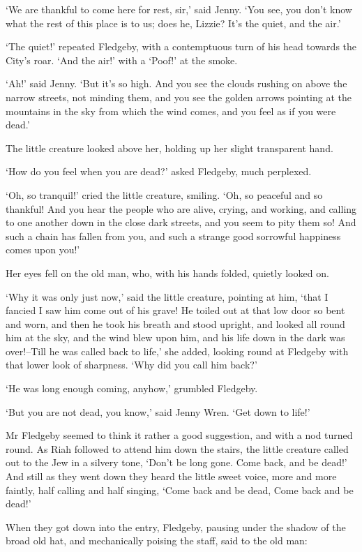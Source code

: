 ‘We are thankful to come here for rest, sir,’ said Jenny. ‘You see, you
don’t know what the rest of this place is to us; does he, Lizzie? It’s
the quiet, and the air.’

‘The quiet!’ repeated Fledgeby, with a contemptuous turn of his head
towards the City’s roar. ‘And the air!’ with a ‘Poof!’ at the smoke.

‘Ah!’ said Jenny. ‘But it’s so high. And you see the clouds rushing
on above the narrow streets, not minding them, and you see the golden
arrows pointing at the mountains in the sky from which the wind comes,
and you feel as if you were dead.’

The little creature looked above her, holding up her slight transparent
hand.

‘How do you feel when you are dead?’ asked Fledgeby, much perplexed.

‘Oh, so tranquil!’ cried the little creature, smiling. ‘Oh, so peaceful
and so thankful! And you hear the people who are alive, crying, and
working, and calling to one another down in the close dark streets, and
you seem to pity them so! And such a chain has fallen from you, and such
a strange good sorrowful happiness comes upon you!’

Her eyes fell on the old man, who, with his hands folded, quietly looked
on.

‘Why it was only just now,’ said the little creature, pointing at him,
‘that I fancied I saw him come out of his grave! He toiled out at
that low door so bent and worn, and then he took his breath and stood
upright, and looked all round him at the sky, and the wind blew upon
him, and his life down in the dark was over!--Till he was called back
to life,’ she added, looking round at Fledgeby with that lower look of
sharpness. ‘Why did you call him back?’

‘He was long enough coming, anyhow,’ grumbled Fledgeby.

‘But you are not dead, you know,’ said Jenny Wren. ‘Get down to life!’

Mr Fledgeby seemed to think it rather a good suggestion, and with a nod
turned round. As Riah followed to attend him down the stairs, the little
creature called out to the Jew in a silvery tone, ‘Don’t be long gone.
Come back, and be dead!’ And still as they went down they heard the
little sweet voice, more and more faintly, half calling and half
singing, ‘Come back and be dead, Come back and be dead!’

When they got down into the entry, Fledgeby, pausing under the shadow of
the broad old hat, and mechanically poising the staff, said to the old
man:

